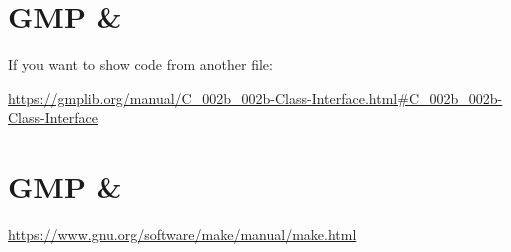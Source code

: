 \section{GMP \& \cpp}

If you want to show code from another file:
\codes{}

\url{https://gmplib.org/manual/C_002b_002b-Class-Interface.html#C_002b_002b-Class-Interface}

\item \cite{gmp}


\section{GMP \& \make}

\url{https://www.gnu.org/software/make/manual/make.html}

\item \cite{make}
